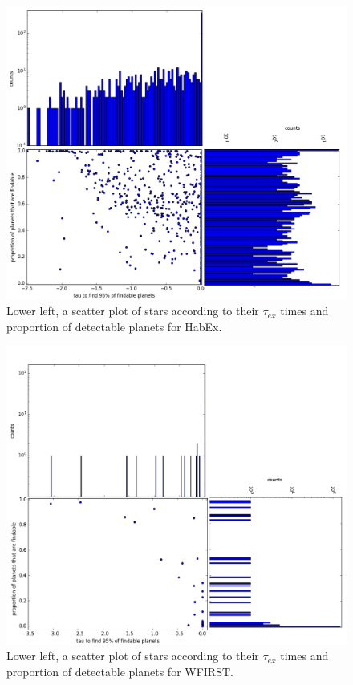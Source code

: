 \documentclass{article}
\begin{document}
	\begin{figure}
		\includegraphics[width = \linewidth]{findable_v_tau_ex_HABEX_log.png}
		\caption{Lower left, a scatter plot of stars according to their $\tau_{ex}$ times and proportion of detectable planets for HabEx.}
		\label{fig:HABEX_tau_ex}
	\end{figure}
	
	\begin{figure}
		\includegraphics[width = \linewidth]{findable_v_tau_ex_WFIRST_composite.png}
		\caption{Lower left, a scatter plot of stars according to their $\tau_{ex}$ times and proportion of detectable planets for WFIRST.}
		\label{fig:WFIRST_tau_ex}
	\end{figure}
	
\end{document}
